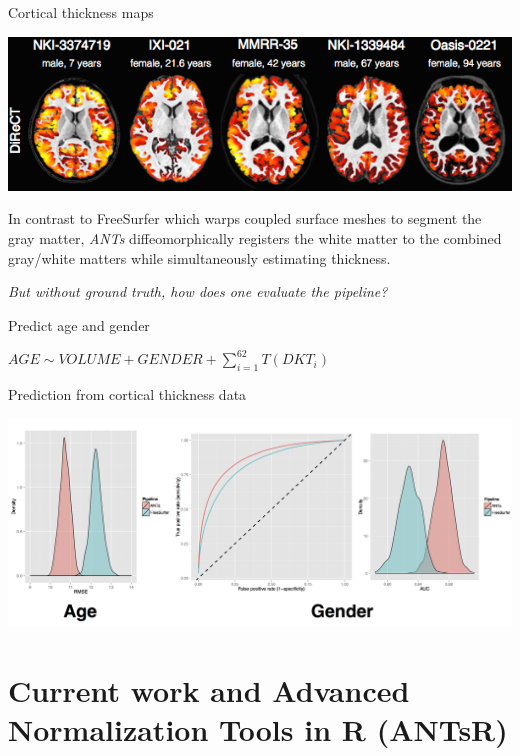 \documentclass[ignorenonframetext,]{beamer}
\begin{document}
\begin{frame}{Cortical thickness maps}

\includegraphics{./evaluation/figures/corticalThicknessEstimation.png}

In contrast to FreeSurfer which warps coupled surface meshes to segment
the gray matter, \emph{ANTs} diffeomorphically registers the white
matter to the combined gray/white matters while simultaneously
estimating thickness.

\end{frame}

\begin{frame}

\emph{But without ground truth, how does one evaluate the pipeline?}

\end{frame}

\begin{frame}{Predict age and gender}

\(AGE \sim VOLUME + GENDER + \sum_{i=1}^{62} T(DKT_i)\)

\end{frame}

\begin{frame}{Prediction from cortical thickness data}

\includegraphics{./evaluation/figures/evaluation.png}

\end{frame}

\section{Current work and Advanced Normalization Tools in R
(ANTsR)}\label{current-work-and-advanced-normalization-tools-in-r-antsr}
\end{document}
